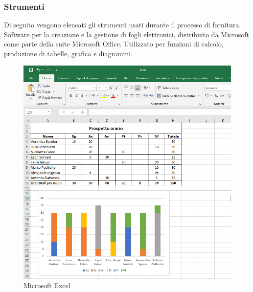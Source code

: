     \subsubsection{Strumenti}
    Di seguito vengono elencati gli strumenti usati durante il processo di fornitura.
    Software per la creazione e la gestione di fogli elettronici, distribuito da Microsoft come parte della suite Microsoft Office. Utilizzato per funzioni di calcolo, produzione di tabelle, grafica e diagrammi. \\
    \begin{figure}[h!]
       	\centering
       	\includegraphics[scale=0.62]{./res/img/excel.png}
       	\caption{Microsoft Excel}
   	\end{figure}
    